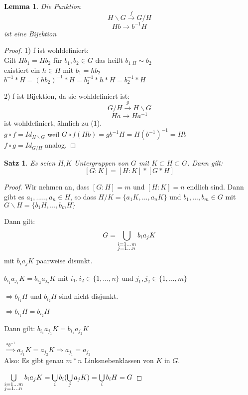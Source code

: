 \documentclass[12pt]{scrartcl}%
\newtheorem{thm}{Satz}
\newtheorem{lemma}{Lemma}
\theoremstyle{definition}
\theoremstyle{remark}
\begin{document}
\begin{lemma} 
Die Funktion
$$  	H\backslash G   \xrightarrow{f} G/H $$
$$	Hb \rightarrow b^{-1}H$$
ist eine Bijektion

\end{lemma}

\begin{proof}
1) f ist wohldefiniert:\\
Gilt $Hb_{1}=Hb_{2}$ für $b_{1},b_{2} \in G$
das heißt $b_{1} {_{\ H}}\sim b_{2}$ \\
existiert ein $h \in H$ mit $b_1 = hb_2$ \\
$b^{-1}*H = (hb_2)^{-1}*H = b_{2}^{-1}*h*H =  b_{2}^{-1}*H$ 

2) f ist Bijektion, da sie wohldefiniert ist:\\
$$  	G/H   \xrightarrow{g} H\backslash G $$
$$	Ha \rightarrow Ha^{-1}$$
ist wohldefiniert, ähnlich zu (1).\\
$g \circ f = Id_{H \backslash G}$ weil $G \circ f(Hb) = gb^{-1}H=H(b^{-1})^{-1}=Hb$ \\
$f \circ g = Id_{G \slash H}$ analog.
\end{proof}

\begin{thm}
Es seien $H$,$K$ Untergruppen von $G$ mit $K \subset H \subset G$. Dann gilt: $$[G:K]=[H:K]*[G*H]$$
\end{thm}

\begin{proof}
Wir nehmen an, dass $[G:H]=m$ und $[H:K]=n$ endlich sind. 
Dann gibt es $a_1,.....,a_n \in H$, so dass
$H/K=\{ a_1K,...,a_nK\}$ und $b_1,...,b_m \in G$ mit
$G\backslash H=\{ b_1H,...,b_mH\}$

Dann gilt:
$$G=\bigcup\limits_{\begin{subarray}{1}i=1...m \\ j=1...n\end{subarray}} b_ia_jK$$
mit $b_ia_jK$ paarweise disunkt.

$b_{i_{1}}a_{j_{1}}K=b_{i_{2}}a_{j_{2}}K$ mit $i_1,i_2 \in \{1,...,n \}$ und $j_1,j_2 \in \{1,...,m \}$

$\Rightarrow b_{i_{1}}H$ und $b_{i_{2}}H$ sind nicht disjunkt.

$\Rightarrow b_{i_{1}}H=b_{i_{2}}H$

Dann gilt: $b_{i_{1}}a_{j_{1}}K=b_{i_{1}}a_{j_{2}}K$

$\overset{*b^{-1}}{\Rightarrow} a_{j_{1}}K=a_{j_{2}}K \Rightarrow a_{j_{1}}=a_{j_{2}}$ \\
Also: Es gibt genau $m*n$ Linksnebenklassen von $K$ in $G$.

$\bigcup\limits_{\begin{subarray}{1}i=1...m \\ j=1...n\end{subarray}} b_ia_jK =  \bigcup\limits_i b_i( \bigcup\limits_j a_jK)= \bigcup\limits_i b_iH=G$

\end{proof}
\end{document}
